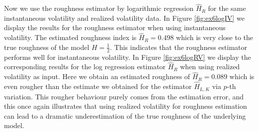 \documentclass{article}
\begin{document}
Now we use the roughness estimator by logarithmic regression $\hat{H}_R$ for the same instantaneous volatility and realized volatility data. In Figure \ref{fig:ex6logIV} we display the results for the roughness estimator when using instantaneous volatility. The estimated roughness index is $\hat{H}_R=0.498$ which is very close to the true roughness of the model $H=\frac{1}{2}$. This indicates that the roughness estimator performs well for instantaneous volatility. In Figure \ref{fig:ex6logRV} we display the corresponding results for the log regression estimator $\hat{H}_R$ when using realized volatility as input. Here we obtain an estimated roughness of $\hat{H}_R=0.089$ which is even rougher than the estimate we obtained for the estimator $\hat{H}_{L,K}$ via $p$-th variation. This rougher behaviour purely comes from the estimation error, and this once again illustrates that using realized volatility for roughness estimation can lead to a dramatic underestimation of the true roughness of the underlying model.
\end{document}
